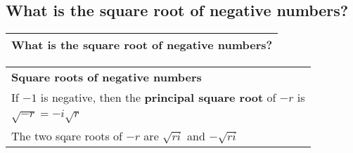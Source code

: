 \subsection{What is the square root of negative numbers?}
\begin{small}
    \begin{tabularx}{1\textwidth}{
            p{}
        }
        \toprule
            What is the square root of negative numbers?
        \\
        \bottomrule
    \end{tabularx}
\end{small}
\begin{small}
    \begin{tabularx}{1\textwidth}{
            p{}
        }
        \toprule
        \textbf{Square roots of negative numbers} \\
        If $-1$ is negative, then the \textbf{principal square root} of $-r$ is\\
        $ \sqrt{-r} = -i\sqrt{r} $ \\
        The two sqare roots of $-r$ are $\sqrt{ri}$ and $-\sqrt{ri}$
        \\
        \bottomrule
    \end{tabularx}
\end{small}
